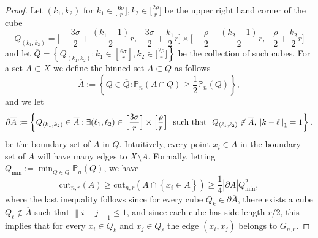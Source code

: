 \documentclass[11pt,twoside]{article}
\newcommand{\set}[1]{\left\{#1\right\}}
\newcommand{\cut}{\mathrm{cut}}
\newcommand{\abs}[1]{\left \lvert #1 \right \rvert}
\newcommand{\norm}[1]{\left\lVert#1\right\rVert}
\newcommand{\1}{\mathbf{1}}
\newcommand{\Pbb}{\mathbb{P}}
\begin{document}
\begin{proof}
	Let $(k_1,k_2)$ for $k_1 \in \bigl[\frac{6\sigma}{r}\bigr], k_2 \in \bigl[\frac{2\rho}{r}\bigr]$ be the upper right hand corner of the cube
	\begin{equation*}
	Q_{(k_1,k_2)} = \biggl[-\frac{3\sigma}{2} + \frac{(k_1 - 1)}{2}r, -\frac{3\sigma}{2} + \frac{k_1}{2}r\biggr] \times \biggl[-\frac{\rho}{2} + \frac{(k_2 - 1)}{2}r, -\frac{\rho}{2} + \frac{k_2}{2}r\biggr]
	\end{equation*}
	and let $\overline{Q} = \set{Q_{(k_1,k_2)}: k_1 \in \left[\frac{6\sigma}{r}\right], k_2 \in \bigl[\frac{2\rho}{r}\bigr]}$ be the collection of such cubes. For a set $A \subset X$ we define the binned set $\overline{A} \subset \overline{Q}$ as follows
	\begin{equation*}
	\overline{A} := \set{Q \in \overline{Q}: \Pbb_n(A \cap Q) \geq \frac{1}{2}\Pbb_n(Q)},
	\end{equation*}
	and we let 
	\begin{equation*}
	\partial \overline{A} := \set{Q_{(k_1,k_2)} \in \overline{A}: \exists (\ell_1,\ell_2) \in \Bigl[\frac{3\sigma}{r}\Bigr] \times \Bigl[\frac{\rho}{r}\Bigr]~~\textrm{such that}~~Q_{(\ell_1,\ell_2)} \not\in \overline{A}, \norm{k - \ell}_1 = 1}.
	\end{equation*}
	be the boundary set of $\overline{A}$ in $\overline{Q}$. Intuitively, every point $x_i \in A$ in the boundary set of $\overline{A}$ will have many edges to $X\setminus A$. Formally, letting $Q_{\min} := \min_{Q \in \overline{Q}} \mathbb{P}_n(Q)$, we have
	\begin{equation}
	\label{eqn:normalized_cut_lb_pf1}
	\cut_{n,r}(A) \geq \cut_{n,r}(A \cap \set{x_i \in \overline{A}}) \geq \frac{1}{4} \abs{\partial \overline{A}} Q_{\min}^2,
	\end{equation}
	where the last inequality follows since for every cube $Q_k \in \partial\overline{A}$, there exists a cube $Q_\ell \not\in \overline{A}$ such that $\norm{i - j}_1 \leq 1$, and since each cube has side length $r/2$, this implies that for every $x_i \in Q_k$ and $x_j \in Q_\ell$ the edge $(x_i,x_j)$ belongs to $G_{n,r}$. 
	

\end{proof}
\end{document}
